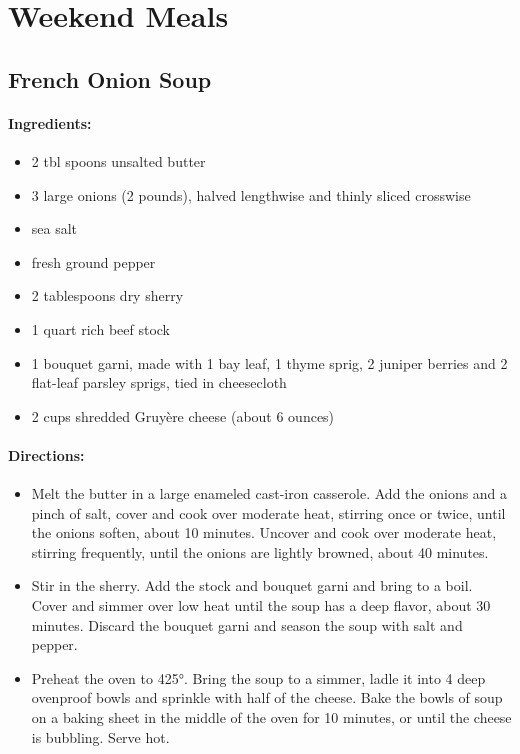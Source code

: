 \documentclass{article}
\begin{document}
\section{Weekend Meals}

\subsection{French Onion Soup}

\paragraph{Ingredients:}

\begin{itemize}
	\item 2 tbl spoons unsalted butter
	\item 3 large onions (2 pounds), halved lengthwise and thinly sliced crosswise
	\item sea salt
	\item fresh ground pepper
	\item 2 tablespoons dry sherry
	\item 1 quart rich beef stock
	\item 1 bouquet garni, made with 1 bay leaf, 1 thyme sprig, 2 juniper berries and 2 flat-leaf parsley sprigs, tied in cheesecloth
	\item 2 cups shredded Gruyère cheese (about 6 ounces)
\end{itemize}

\paragraph{Directions:}
\begin{itemize}
	\item Melt the butter in a large enameled cast-iron casserole. Add the onions and a pinch of salt, cover and cook over moderate heat, stirring once or twice, until the onions soften, about 10 minutes. Uncover and cook over moderate heat, stirring frequently, until the onions are lightly browned, about 40 minutes.
	\item Stir in the sherry. Add the stock and bouquet garni and bring to a boil. Cover and simmer over low heat until the soup has a deep flavor, about 30 minutes. Discard the bouquet garni and season the soup with salt and pepper.
	\item Preheat the oven to 425°. Bring the soup to a simmer, ladle it into 4 deep ovenproof bowls and sprinkle with half of the cheese. Bake the bowls of soup on a baking sheet in the middle of the oven for 10 minutes, or until the cheese is bubbling. Serve hot.
\end{itemize}
\end{document}
